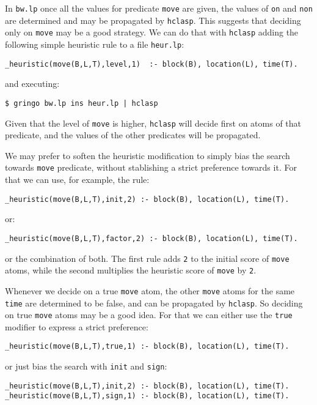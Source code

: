  In \texttt{bw.lp} once all the values for predicate \texttt{move} are given,  the values of \texttt{on} and \texttt{non} are determined and may be propagated by \texttt{hclasp}. This suggests that deciding only on \texttt{move} may be a good strategy. We can do that with \texttt{hclasp} adding the following simple heuristic rule to a file \texttt{heur.lp}: 
\begin{verbatim}
_heuristic(move(B,L,T),level,1)  :- block(B), location(L), time(T).\end{verbatim}

and executing:
\begin{verbatim}
$ gringo bw.lp ins heur.lp | hclasp\end{verbatim}

 Given that the level of \texttt{move} is higher,  \texttt{hclasp} will decide first on atoms of that predicate,  and the values of the other predicates will be propagated. 

 We may prefer to soften the heuristic modification to simply bias the search  towards \texttt{move} predicate, without stablishing a strict preference towards it.  For that we can use, for example, the rule: 
\begin{verbatim}
_heuristic(move(B,L,T),init,2) :- block(B), location(L), time(T).\end{verbatim} or: 
\begin{verbatim}
_heuristic(move(B,L,T),factor,2) :- block(B), location(L), time(T).\end{verbatim}

 or the combination of both.  The first rule adds \texttt{2} to the initial score of \texttt{move} atoms,  while the second multiplies the heuristic score of \texttt{move} by \texttt{2}.  

 Whenever we decide on a true \texttt{move} atom,  the other \texttt{move} atoms for the same \texttt{time} are determined to be false,  and can be propagated by \texttt{hclasp}. So deciding on true \texttt{move} atoms may be a good idea. For that we can either use the \texttt{true} modifier to express a strict preference: 
\begin{verbatim}
_heuristic(move(B,L,T),true,1) :- block(B), location(L), time(T).\end{verbatim}

or just bias the search with \texttt{init} and \texttt{sign}:
\begin{verbatim}
_heuristic(move(B,L,T),init,2) :- block(B), location(L), time(T).
_heuristic(move(B,L,T),sign,1) :- block(B), location(L), time(T).\end{verbatim}

